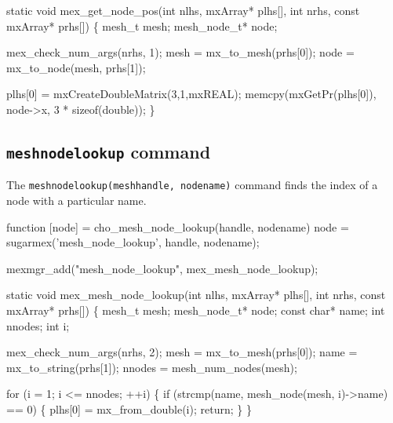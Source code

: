 static void mex_get_node_pos(int nlhs, mxArray* plhs[],
                             int nrhs, const mxArray* prhs[])
\{
    mesh_t       mesh;
    mesh_node_t* node;

    mex_check_num_args(nrhs, 1);
    mesh = mx_to_mesh(prhs[0]);
    node = mx_to_node(mesh, prhs[1]);

    plhs[0] = mxCreateDoubleMatrix(3,1,mxREAL);
    memcpy(mxGetPr(plhs[0]), node->x, 3 * sizeof(double));
\}

\nwendcode{}\nwdocspar


\subsection{{\tt{}mesh{}node{}lookup} command}

The {\tt{}mesh{}node{}lookup(mesh{}handle,\ node{}name)} command
finds the index of a node with a particular name.

\nwenddocs{}\endmoddef
function [node] = cho_mesh_node_lookup(handle, nodename)
node = sugarmex('mesh_node_lookup', handle, nodename);
\nwendcode{}\nwdocspar

\nwenddocs{}\plusendmoddef
mexmgr_add("mesh_node_lookup", mex_mesh_node_lookup);
\nwendcode{}\nwdocspar

\nwenddocs{}\plusendmoddef
static void mex_mesh_node_lookup(int nlhs, mxArray* plhs[],
                                 int nrhs, const mxArray* prhs[])
\{
    mesh_t       mesh;
    mesh_node_t* node;
    const char*  name;
    int          nnodes;
    int          i;

    mex_check_num_args(nrhs, 2);
    mesh = mx_to_mesh(prhs[0]);
    name = mx_to_string(prhs[1]);
    nnodes = mesh_num_nodes(mesh);

    for (i = 1; i <= nnodes; ++i) \{
        if (strcmp(name, mesh_node(mesh, i)->name) == 0) \{
            plhs[0] = mx_from_double(i);
            return;
        \}
    \}

